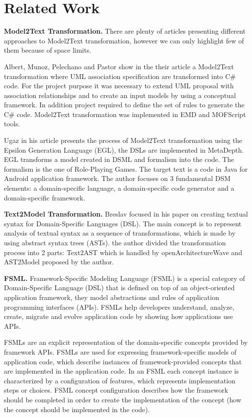 \section{Related Work}
\textbf{Model2Text Transformation.} There are plenty of articles presenting different approaches to Model2Text transformation, however we can only highlight few of them because of space limits.

Albert, Munoz, Pelechano and Pastor show in the their article \cite{manoli} a Model2Text transformation where UML association specification are transformed into C\# code. For the project purpose it was necessary to extend UML proposal with association relationships and to create an input models by using a conceptual framework. In addition project required to define the set of rules to generate the C\# code. Model2Text transformation was implemented in EMD and MOFScript tools.

Ugaz in his article \cite{ugaz} presents the process of Model2Text transformation using the Epsilon Generation Language (EGL), the DSLs are implemented in MetaDepth. EGL transforms a model created in DSML and formalism into the code. The formalism is the one of Role-Playing Games. The target text is a code in Java for Android application framework. The author focuses on 3 fundamental DSM elements: a domain-specific language, a domain-specific code generator and a domain-specific framework.


\textbf{Text2Model Transformation.} Breslav focused in his paper \cite{breslav} on creating textual syntax for Domain-Specific Languages (DSL). The main concept is to represent analysis of textual syntax as a sequence of transformations, which is made by using abstract syntax trees (ASTs). the author divided the transformation process into 2 parts: Text2AST which is handled by openArchitectureWave and AST2Model proposed by the author.


\textbf{FSML.} Framework-Specific Modeling Language (FSML) is a special category of Domain-Specific Language (DSL) that is defined on top of an object-oriented application framework, they model abstractions and rules of application programming interfaces (APIs). FSMLs help developers understand, analyze, create, migrate and evolve application code by showing how applications use APIs.

FSMLs are an explicit representation of the domain-specific concepts provided by framework APIs. FSMLs are used for expressing framework-specific models of application code, which describe instances of framework-provided concepts that are implemented in the application code. In an FSML each concept instance is characterized by a configuration of features, which represents implementation steps or choices. FSML concept configuration describes how the framework should be completed in order to create the implementation of the concept (how the concept should be implemented in the code).

